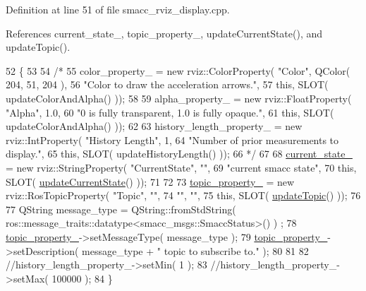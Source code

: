Definition at line 51 of file smacc\+\_\+rviz\+\_\+display.\+cpp.



References current\+\_\+state\+\_\+, topic\+\_\+property\+\_\+, update\+Current\+State(), and update\+Topic().


\begin{DoxyCode}
52 \{
53 
54   \textcolor{comment}{/*}
55 \textcolor{comment}{  color\_property\_ = new rviz::ColorProperty( "Color", QColor( 204, 51, 204 ),}
56 \textcolor{comment}{                                             "Color to draw the acceleration arrows.",}
57 \textcolor{comment}{                                             this, SLOT( updateColorAndAlpha() ));}
58 \textcolor{comment}{}
59 \textcolor{comment}{  alpha\_property\_ = new rviz::FloatProperty( "Alpha", 1.0,}
60 \textcolor{comment}{                                             "0 is fully transparent, 1.0 is fully opaque.",}
61 \textcolor{comment}{                                             this, SLOT( updateColorAndAlpha() ));}
62 \textcolor{comment}{}
63 \textcolor{comment}{  history\_length\_property\_ = new rviz::IntProperty( "History Length", 1,}
64 \textcolor{comment}{                                                    "Number of prior measurements to display.",}
65 \textcolor{comment}{                                                    this, SLOT( updateHistoryLength() ));}
66 \textcolor{comment}{                                                    */}
67 
68   \hyperlink{classsmacc__rviz__plugin_1_1SmaccRvizDisplay_a342ff238c1dfaa427f09ee205a9e92d5}{current\_state\_} = \textcolor{keyword}{new} rviz::StringProperty( \textcolor{stringliteral}{"CurrentState"}, \textcolor{stringliteral}{""},
69                                                     \textcolor{stringliteral}{"current smacc state"},
70                                                     \textcolor{keyword}{this}, SLOT( 
      \hyperlink{classsmacc__rviz__plugin_1_1SmaccRvizDisplay_a6031090e46077a5e95754b5f70ea639a}{updateCurrentState}() ));
71 
72   
73   \hyperlink{classsmacc__rviz__plugin_1_1SmaccRvizDisplay_ad81e5239e1343b2ba01ee16d1f010932}{topic\_property\_} = \textcolor{keyword}{new} rviz::RosTopicProperty( \textcolor{stringliteral}{"Topic"}, \textcolor{stringliteral}{""},
74                                             \textcolor{stringliteral}{""}, \textcolor{stringliteral}{""},
75                                             \textcolor{keyword}{this}, SLOT( \hyperlink{classsmacc__rviz__plugin_1_1SmaccRvizDisplay_adf332ae95bd83969b33ba713a60832fd}{updateTopic}() ));
76 
77   QString message\_type = QString::fromStdString( ros::message\_traits::datatype<smacc\_msgs::SmaccStatus>() )
      ;
78       \hyperlink{classsmacc__rviz__plugin_1_1SmaccRvizDisplay_ad81e5239e1343b2ba01ee16d1f010932}{topic\_property\_}->setMessageType( message\_type );
79       \hyperlink{classsmacc__rviz__plugin_1_1SmaccRvizDisplay_ad81e5239e1343b2ba01ee16d1f010932}{topic\_property\_}->setDescription( message\_type + \textcolor{stringliteral}{" topic to subscribe to."} );
80 
81 
82   \textcolor{comment}{//history\_length\_property\_->setMin( 1 );}
83   \textcolor{comment}{//history\_length\_property\_->setMax( 100000 );}
84 \}
\end{DoxyCode}

